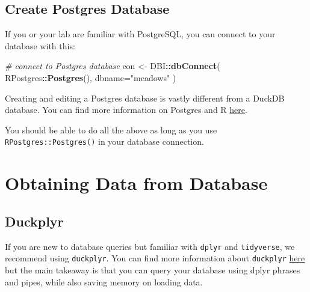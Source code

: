 \documentclass[
]{book}
\newenvironment{Shaded}{\begin{snugshade}}{\end{snugshade}}
\newcommand{\AttributeTok}[1]{\textcolor[rgb]{0.13,0.29,0.53}{#1}}
\newcommand{\CommentTok}[1]{\textcolor[rgb]{0.56,0.35,0.01}{\textit{#1}}}
\newcommand{\FunctionTok}[1]{\textcolor[rgb]{0.13,0.29,0.53}{\textbf{#1}}}
\newcommand{\NormalTok}[1]{#1}
\newcommand{\OtherTok}[1]{\textcolor[rgb]{0.56,0.35,0.01}{#1}}
\newcommand{\SpecialCharTok}[1]{\textcolor[rgb]{0.81,0.36,0.00}{\textbf{#1}}}
\newcommand{\StringTok}[1]{\textcolor[rgb]{0.31,0.60,0.02}{#1}}
\begin{document}
\section{Create Postgres Database}\label{create-postgres-database}

If you or your lab are familiar with PostgreSQL, you can connect to your database with this:

\begin{Shaded}
\begin{Highlighting}[]
\CommentTok{\# connect to Postgres database}
\NormalTok{con }\OtherTok{\textless{}{-}}\NormalTok{ DBI}\SpecialCharTok{::}\FunctionTok{dbConnect}\NormalTok{(}
\NormalTok{  RPostgres}\SpecialCharTok{::}\FunctionTok{Postgres}\NormalTok{(),}
  \AttributeTok{dbname=}\StringTok{"meadows"}
\NormalTok{)}
\end{Highlighting}
\end{Shaded}

Creating and editing a Postgres database is vastly different from a DuckDB database. You can find more information on Postgres and R \href{https://faculty.washington.edu/phurvitz/r_sql/createdb.html}{here}.

You should be able to do all the above as long as you use \texttt{RPostgres::Postgres()} in your database connection.

\chapter{Obtaining Data from Database}\label{obtaining-data-from-database}

\section{Duckplyr}\label{duckplyr}

If you are new to database queries but familiar with \texttt{dplyr} and \texttt{tidyverse}, we recommend using \texttt{duckplyr}. You can find more information about \texttt{duckplyr} \href{https://duckdb.org/2024/04/02/duckplyr.html}{here} but the main takeaway is that you can query your database using dplyr phrases and pipes, while also saving memory on loading data.
\end{document}
